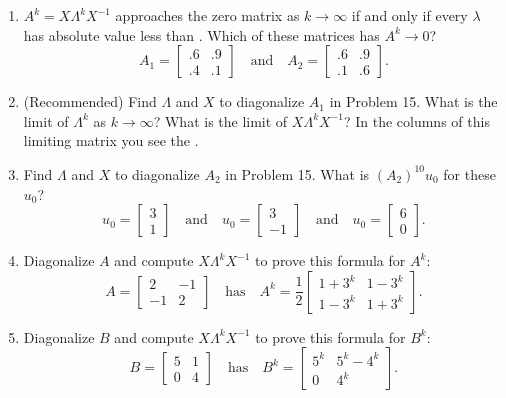 \documentclass[14pt, a4paper]{article}
\begin{document}
\begin{enumerate}[resume]
    \item $A^k = X \Lambda^k X^{-1}$ approaches the zero matrix as $k \to \infty$ if and only if every $\lambda$ has absolute value less than \underline{\hspace{1cm}} . Which of these matrices has $A^k \to 0$?
          \[
              A_1 = \begin{bmatrix} .6 & .9 \\ .4 & .1 \end{bmatrix} \quad \text{and} \quad A_2 = \begin{bmatrix} .6 & .9 \\ .1 & .6 \end{bmatrix} .
          \]

    \item (Recommended) Find $\Lambda$ and $X$ to diagonalize $A_1$ in Problem 15. What is the limit of $\Lambda^k$ as $k \to \infty$? What is the limit of $X \Lambda^k X^{-1}$? In the columns of this limiting matrix you see the \underline{\hspace{1cm}} .

    \item Find $\Lambda$ and $X$ to diagonalize $A_2$ in Problem 15. What is $(A_2)^{10}u_0$ for these $u_0$?
          \[
              u_0 = \begin{bmatrix} 3 \\ 1 \end{bmatrix} \quad \text{and} \quad u_0 = \begin{bmatrix} 3 \\ -1 \end{bmatrix} \quad \text{and} \quad u_0 = \begin{bmatrix} 6 \\ 0 \end{bmatrix} .
          \]

    \item Diagonalize $A$ and compute $X \Lambda^k X^{-1}$ to prove this formula for $A^k$:
          \[
              A = \begin{bmatrix} 2 & -1 \\ -1 & 2 \end{bmatrix} \quad \text{has} \quad A^k = \frac{1}{2} \begin{bmatrix} 1 + 3^k & 1 - 3^k \\ 1 - 3^k & 1 + 3^k \end{bmatrix} .
          \]

    \item Diagonalize $B$ and compute $X \Lambda^k X^{-1}$ to prove this formula for $B^k$:
          \[
              B = \begin{bmatrix} 5 & 1 \\ 0 & 4 \end{bmatrix} \quad \text{has} \quad B^k = \begin{bmatrix} 5^k & 5^k - 4^k \\ 0 & 4^k \end{bmatrix} .
          \]


\end{enumerate}
\end{document}
